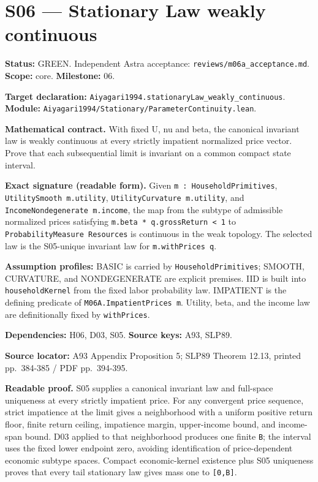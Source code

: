\documentclass[
  11pt,
]{article}
\let\LedgerOriginalTexttt\texttt
\renewcommand{\texttt}[1]{{\small\LedgerOriginalTexttt{#1}}}
\begin{document}
\section{S06 --- Stationary Law weakly
continuous}\label{s06-stationary-law-weakly-continuous}

\textbf{Status:} GREEN. Independent Astra acceptance:
\texttt{reviews/m06a\_acceptance.md}. \textbf{Scope:} core.
\textbf{Milestone:} 06.

\textbf{Target declaration:}
\texttt{Aiyagari1994.stationaryLaw\_weakly\_continuous}.\\
\textbf{Module:}
\texttt{Aiyagari1994/Stationary/ParameterContinuity.lean}.

\textbf{Mathematical contract.} With fixed U, nu and beta, the canonical
invariant law is weakly continuous at every strictly impatient
normalized price vector. Prove that each subsequential limit is
invariant on a common compact state interval.

\textbf{Exact signature (readable form).} Given
\texttt{m\ :\ HouseholdPrimitives}, \texttt{UtilitySmooth\ m.utility},
\texttt{UtilityCurvature\ m.utility}, and
\texttt{IncomeNondegenerate\ m.income}, the map from the subtype of
admissible normalized prices satisfying
\texttt{m.beta\ *\ q.grossReturn\ \textless{}\ 1} to
\texttt{ProbabilityMeasure\ Resources} is continuous in the weak
topology. The selected law is the S05-unique invariant law for
\texttt{m.withPrices\ q}.

\textbf{Assumption profiles:} BASIC is carried by
\texttt{HouseholdPrimitives}; SMOOTH, CURVATURE, and NONDEGENERATE are
explicit premises. IID is built into \texttt{householdKernel} from the
fixed labor probability law. IMPATIENT is the defining predicate of
\texttt{M06A.ImpatientPrices\ m}. Utility, beta, and the income law are
definitionally fixed by \texttt{withPrices}.

\textbf{Dependencies:} H06, D03, S05. \textbf{Source keys:} A93, SLP89.

\textbf{Source locator:} A93 Appendix Proposition 5; SLP89 Theorem
12.13, printed pp.~384-385 / PDF pp.~394-395.

\textbf{Readable proof.} S05 supplies a canonical invariant law and
full-space uniqueness at every strictly impatient price. For any
convergent price sequence, strict impatience at the limit gives a
neighborhood with a uniform positive return floor, finite return
ceiling, impatience margin, upper-income bound, and income-span bound.
D03 applied to that neighborhood produces one finite \texttt{B}; the
interval uses the fixed lower endpoint zero, avoiding identification of
price-dependent economic subtype spaces. Compact economic-kernel
existence plus S05 uniqueness proves that every tail stationary law
gives mass one to \texttt{{[}0,B{]}}.
\end{document}
